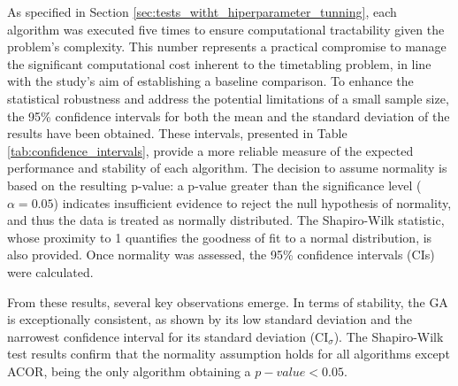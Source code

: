 \documentclass[Afour,sagev,times]{sagej}
\begin{document}
As specified in Section \ref{sec:tests_witht_hiperparameter_tunning}, each algorithm was executed five times to ensure computational tractability given the problem's complexity. This number represents a practical compromise to manage the significant computational cost inherent to the timetabling problem, in line with the study's aim of establishing a baseline comparison. To enhance the statistical robustness and address the potential limitations of a small sample size, the 95\% confidence intervals for both the mean and the standard deviation of the results have been obtained. These intervals, presented in Table \ref{tab:confidence_intervals}, provide a more reliable measure of the expected performance and stability of each algorithm. The decision to assume normality is based on the resulting p-value: a p-value greater than the significance level ($\alpha = 0.05$) indicates insufficient evidence to reject the null hypothesis of normality, and thus the data is treated as normally distributed. The Shapiro-Wilk \cite{ShapiroWilk} statistic, whose proximity to 1 quantifies the goodness of fit to a normal distribution, is also provided. Once normality was assessed, the 95\% confidence intervals (CIs) were calculated.

From these results, several key observations emerge. In terms of stability, the \gls{GA} is exceptionally consistent, as shown by its low standard deviation and the narrowest confidence interval for its standard deviation ($\text{CI}_{\sigma}$). The Shapiro-Wilk test results confirm that the normality assumption holds for all algorithms except \gls{ACOR}, being the only algorithm obtaining a $p-value < 0.05 $.
\end{document}
